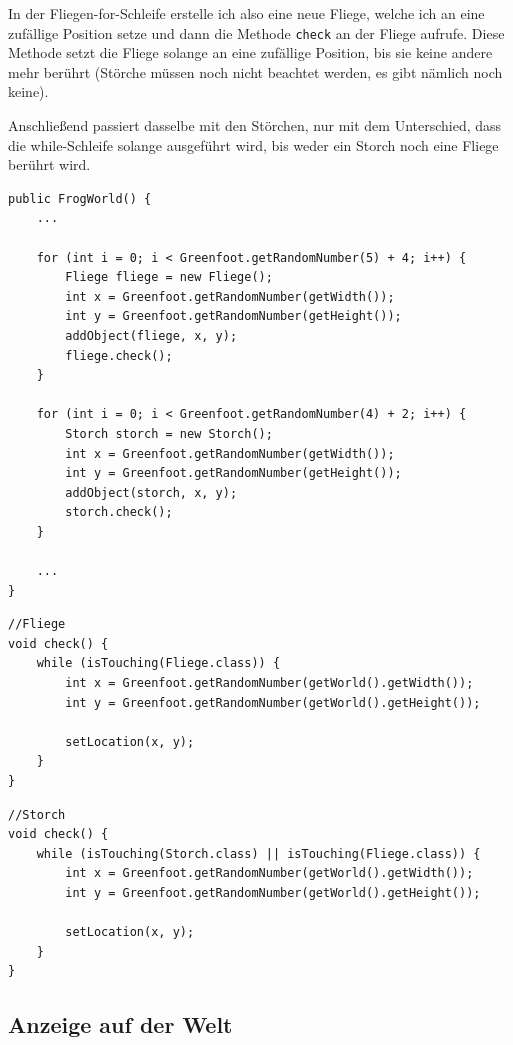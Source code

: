 \documentclass{scrartcl}   %
\begin{document}
\begin{itemize}
    In der Fliegen-for-Schleife erstelle ich also eine neue Fliege, welche ich an eine zufällige Position setze und dann die Methode \texttt{check} an der Fliege aufrufe. Diese Methode setzt die Fliege solange an eine zufällige Position, bis sie keine andere mehr berührt (Störche müssen noch nicht beachtet werden, es gibt nämlich noch keine).
    
    Anschließend passiert dasselbe mit den Störchen, nur mit dem Unterschied, dass die while-Schleife solange ausgeführt wird, bis weder ein Storch noch eine Fliege berührt wird.\\
    \begin{lstlisting}
public FrogWorld() {    
    ...
    
    for (int i = 0; i < Greenfoot.getRandomNumber(5) + 4; i++) {
        Fliege fliege = new Fliege();
        int x = Greenfoot.getRandomNumber(getWidth());
        int y = Greenfoot.getRandomNumber(getHeight());
        addObject(fliege, x, y);
        fliege.check();
    }
    
    for (int i = 0; i < Greenfoot.getRandomNumber(4) + 2; i++) {
        Storch storch = new Storch();
        int x = Greenfoot.getRandomNumber(getWidth());
        int y = Greenfoot.getRandomNumber(getHeight());
        addObject(storch, x, y);
        storch.check();
    }
    
    ...
}
    \end{lstlisting}
    
    \newpage
    
    \begin{lstlisting}
//Fliege
void check() {
    while (isTouching(Fliege.class)) {
        int x = Greenfoot.getRandomNumber(getWorld().getWidth());
        int y = Greenfoot.getRandomNumber(getWorld().getHeight());
        
        setLocation(x, y);
    }
}
    \end{lstlisting}
    \begin{lstlisting}
//Storch
void check() {
    while (isTouching(Storch.class) || isTouching(Fliege.class)) {
        int x = Greenfoot.getRandomNumber(getWorld().getWidth());
        int y = Greenfoot.getRandomNumber(getWorld().getHeight());
        
        setLocation(x, y);
    }
}
    \end{lstlisting}
\end{itemize}

\subsection{Anzeige auf der Welt}
\end{document}
